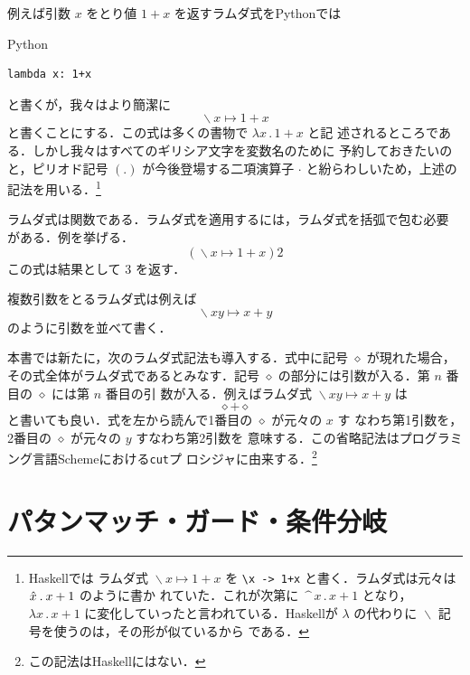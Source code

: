 \documentclass[a5paper,twoside,fleqn,draft]{jsbook}
\newcommand{\programminglanguage}[1]{\textsf{#1}}
\newcommand{\haskell}{\programminglanguage{Haskell}}
\newcommand{\python}{\programminglanguage{Python}}
\newcommand{\scheme}{\programminglanguage{Scheme}}
\newcommand{\code}[1]{\texttt{#1}}
\newenvironment{pythoncode}{\begin{itembox}[r]{\python}}{\end{itembox}}
\newcommand{\mAnonParam}{\diamond}
\DeclareMathOperator{\mLambda}{\backslash}
\DeclareMathOperator{\mLambdaArrow}{\mapsto}
\newcommand{\mLambdaEXP}[2]{\mLambda{#1}\mLambdaArrow{#2}} %
\begin{document}
例えば引数 $x$ をとり値 $1+x$ を返すラムダ式を\python では
\begin{pythoncode}
\begin{verbatim}
lambda x: 1+x
\end{verbatim}
\end{pythoncode}
と書くが，我々はより簡潔に
\begin{equation}
  \mLambda x\mLambdaArrow1+x
\end{equation}
と書くことにする．この式は多くの書物で $\lambda x\mathbin{.}1+x$ と記
述されるところである．しかし我々はすべてのギリシア文字を変数名のために
予約しておきたいのと，ピリオド記号 $(.)$ が今後登場する二項演算子
$\cdot$ と紛らわしいため，上述の記法を用いる．\footnote{\haskell では
  ラムダ式 $\mLambda x\mLambdaArrow1+x$ を \code{\textbackslash x ->
    1+x} と書く．ラムダ式は元々は $\Hat x\mathbin{.}x+1$ のように書か
  れていた．これが次第に
  $\mathop{\texttt{\textasciicircum}}x\mathbin{.}x+1$ となり，$\lambda
  x\mathbin{.}x+1$ に変化していったと言われている．\haskell が
  $\lambda$ の代わりに $\mLambda$ 記号を使うのは，その形が似ているから
  である．}

ラムダ式は関数である．ラムダ式を適用するには，ラムダ式を括弧で包む必要
がある．例を挙げる．
\begin{equation}
  (\mLambda x\mLambdaArrow1+x)2
\end{equation}
この式は結果として $3$ を返す．

複数引数をとるラムダ式は例えば
\begin{equation}
  \mLambda xy\mLambdaArrow x+y
\end{equation}
のように引数を並べて書く．

本書では新たに，次のラムダ式記法も導入する．式中に記号 $\mAnonParam$
が現れた場合，その式全体がラムダ式であるとみなす．記号 $\mAnonParam$
の部分には引数が入る．第 $n$ 番目の $\mAnonParam$ には第 $n$ 番目の引
数が入る．例えばラムダ式 $\mLambdaEXP{xy}{x+y}$ は
\begin{equation}
  \mAnonParam+\mAnonParam
\end{equation}
と書いても良い．式を左から読んで1番目の $\mAnonParam$ が元々の $x$ す
なわち第1引数を，2番目の $\mAnonParam$ が元々の $y$ すなわち第2引数を
意味する．この省略記法はプログラミング言語\scheme における\code{cut}プ
ロシジャに由来する．\footnote{この記法は\haskell にはない．}

\section{パタンマッチ・ガード・条件分岐}
\end{document}

